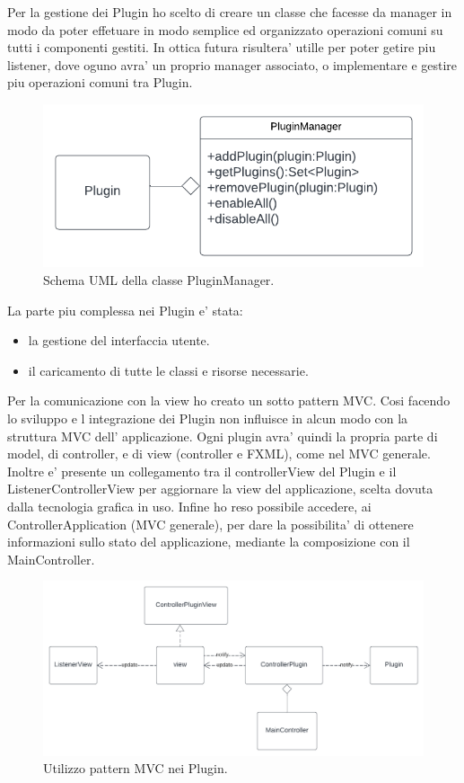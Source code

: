 \documentclass[a4paper,12pt]{report}
\begin{document}
%
Per la gestione dei Plugin ho scelto di creare un classe che facesse da manager in modo da poter effetuare in modo semplice ed organizzato operazioni comuni su tutti i componenti gestiti. In ottica futura risultera' utille per poter getire piu listener, dove oguno avra' un proprio manager associato, o implementare e  gestire piu operazioni comuni tra Plugin.
\begin{figure}[H]
\centering{}
\includegraphics[width=\textwidth]{img/listener/PluginManager.png}
\caption{Schema UML della classe PluginManager.}
\label{img:Listener}
\end{figure}
%
La parte piu complessa nei Plugin e' stata:
\begin{itemize}
	\item la gestione del interfaccia utente.
	\item il caricamento di tutte le classi e risorse necessarie.
\end{itemize}
Per la comunicazione con la view ho creato un sotto pattern MVC. Cosi facendo lo sviluppo e l integrazione dei Plugin non influisce in alcun modo con
la struttura MVC dell' applicazione. Ogni plugin avra' quindi la propria parte di model, di controller, e di view (controller e FXML), come nel MVC generale. Inoltre e' presente un collegamento tra il controllerView del Plugin e il ListenerControllerView per aggiornare la view del applicazione, scelta dovuta dalla tecnologia grafica in uso. Infine ho reso possibile accedere, ai ControllerApplication (MVC generale), per dare la possibilita' di ottenere informazioni sullo stato del applicazione, mediante la composizione con il MainController.
\begin{figure}[H]
\centering{}
\includegraphics[width=\textwidth]{img/listener/PluginMVC.png}
\caption{Utilizzo pattern MVC nei Plugin.}
\label{img:Listener}
\end{figure}
\end{document}

